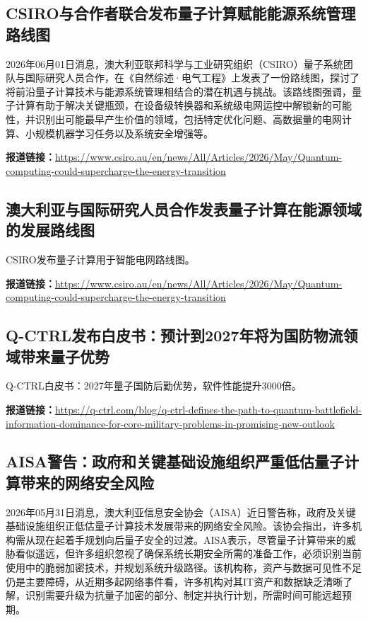 \documentclass[12pt,a4paper]{ctexart}
\begin{document}
\subsection{ CSIRO与合作者联合发布量子计算赋能能源系统管理路线图 }

2026年06月01日消息，澳大利亚联邦科学与工业研究组织（CSIRO）量子系统团队与国际研究人员合作，在《自然综述·电气工程》上发表了一份路线图，探讨了将前沿量子计算技术与能源系统管理相结合的潜在机遇与挑战。该路线图强调，量子计算有助于解决关键瓶颈，在设备级转换器和系统级电网运控中解锁新的可能性，并识别出可能最早产生价值的领域，包括特定优化问题、高数据量的电网计算、小规模机器学习任务以及系统安全增强等。

\noindent\textbf{报道链接：}\url{https://www.csiro.au/en/news/All/Articles/2026/May/Quantum-computing-could-supercharge-the-energy-transition}

\subsection{ 澳大利亚与国际研究人员合作发表量子计算在能源领域的发展路线图 }

CSIRO发布量子计算用于智能电网路线图。

\noindent\textbf{报道链接：}\url{https://www.csiro.au/en/news/All/Articles/2026/May/Quantum-computing-could-supercharge-the-energy-transition}

\subsection{ Q-CTRL发布白皮书：预计到2027年将为国防物流领域带来量子优势 }

Q-CTRL白皮书：2027年量子国防后勤优势，软件性能提升3000倍。

\noindent\textbf{报道链接：}\url{https://q-ctrl.com/blog/q-ctrl-defines-the-path-to-quantum-battlefield-information-dominance-for-core-military-problems-in-promising-new-outlook}

\subsection{ AISA警告：政府和关键基础设施组织严重低估量子计算带来的网络安全风险 }

2026年05月31日消息，澳大利亚信息安全协会（AISA）近日警告称，政府及关键基础设施组织正低估量子计算技术发展带来的网络安全风险。该协会指出，许多机构需从现在起着手规划向后量子安全的过渡。AISA表示，尽管量子计算带来的威胁看似遥远，但许多组织忽视了确保系统长期安全所需的准备工作，必须识别当前使用中的脆弱加密技术，并规划系统升级路径。该机构称，资产与数据可见性不足仍是主要障碍，从近期多起网络事件看，许多机构对其IT资产和数据缺乏清晰了解，识别需要升级为抗量子加密的部分、制定并执行计划，所需时间可能远超预期。
\end{document}

